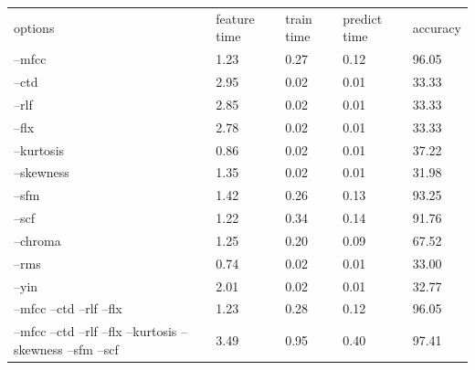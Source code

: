\documentclass[12pt,oneside]{book}
\begin{document}
\begin{table}
\begin{tabular}{|l|l|l|l|l|}
options                                                                          & feature time    &train time      & predict time    & accuracy        \\
--mfcc                                                                           & 1.23            & 0.27            & 0.12            & 96.05           \\
--ctd                                                                            & 2.95            & 0.02            & 0.01            & 33.33           \\
--rlf                                                                            & 2.85            & 0.02            & 0.01            & 33.33           \\
--flx                                                                            & 2.78            & 0.02            & 0.01            & 33.33           \\
--kurtosis                                                                       & 0.86            & 0.02            & 0.01            & 37.22           \\
--skewness                                                                       & 1.35            & 0.02            & 0.01            & 31.98           \\
--sfm                                                                            & 1.42            & 0.26            & 0.13            & 93.25           \\
--scf                                                                            & 1.22            & 0.34            & 0.14            & 91.76           \\
--chroma                                                                         & 1.25            & 0.20            & 0.09            & 67.52           \\
--rms                                                                            & 0.74            & 0.02            & 0.01            & 33.00           \\
--yin                                                                            & 2.01            & 0.02            & 0.01            & 32.77           \\
--mfcc --ctd --rlf --flx                                                         & 1.23            & 0.28            & 0.12            & 96.05           \\
--mfcc --ctd --rlf --flx --kurtosis --skewness --sfm --scf                       & 3.49            & 0.95            & 0.40            & 97.41           \\

\end{tabular}
\end{table}
\end{document}
